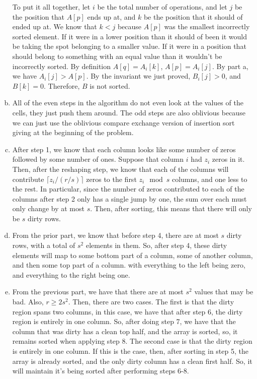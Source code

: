 \documentclass{article}
\begin{document}
\begin{enumerate}[a.]
To put it all together, let $i$ be the total number of operations, and let $j$ be the position that $A[p]$ ends up at, and $k$ be the position that it should of ended up at. We know that $k<j$ because $A[p]$ was the smallest incorrectly sorted element. If it were in a lower position than it should of been it would be taking the spot belonging to a smaller value. If it were in a position that should belong to something with an equal value than it wouldn't be incorrectly sorted.  By definition $A[q] = A_i[k]$, $A[p] = A_i[j]$. By part a, we have $A_i[j] > A[p]$. By the invariant we just proved, $B_i[j]>0$, and $B[k]=0$. Therefore, $B$ is not sorted. 



\item

All of the even steps in the algorithm do not even look at the values of the cells, they just push them around. The odd steps are also oblivious because we can just use the oblivious compare exchange version of insertion sort giving at the beginning of the problem.

\item

After step 1, we know that each column looks like some number of zeros followed by some number of ones. Suppose that column $i$ had $z_i$ zeros in it. Then, after the reshaping step, we know that each of the columns will contribute $\lceil z_i / (r/s) \rceil$ zeros to the first $z_i \mod s$ columns, and one less to the rest. In particular, since the number of zeros contributed to each of the columns after step 2 only has a single jump by one, the sum over each must only change by at most $s$. Then, after sorting, this means that there will only be $s$ dirty rows. 

\item

From the prior part, we know that before step 4, there are at most $s$ dirty rows, with a total of $s^2$ elements in them. So, after step 4, these dirty elements will map to some bottom part of a column, some of another column, and then some top part of a column. with everything to the left being zero, and everything to the right being one.

\item

From the previous part, we have that there are at most $s^2$ values that may be bad. Also, $r\ge 2s^2$. Then, there are two cases. The first is that the dirty region spans two columns, in this case, we have that after step 6, the dirty region is entirely in one column. So, after doing step 7, we have that the column that was dirty has a clean top half, and the array is sorted, so, it remains sorted when applying step 8. The second case is that the dirty region is entirely in one column. If this is the case, then, after sorting in step 5, the array is already sorted, and the only dirty column has a clean first half. So, it will maintain it's being sorted after performing steps 6-8.


\end{enumerate}
\end{document}
